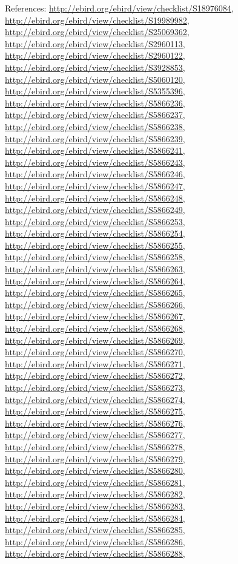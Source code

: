 \documentclass[9pt, article]{memoir}
\begin{document}
\begin{multicols}{2}
References: 
\url{http://ebird.org/ebird/view/checklist/S18976084}, 
\url{http://ebird.org/ebird/view/checklist/S19989982}, 
\url{http://ebird.org/ebird/view/checklist/S25069362}, 
\url{http://ebird.org/ebird/view/checklist/S2960113}, 
\url{http://ebird.org/ebird/view/checklist/S2960122}, 
\url{http://ebird.org/ebird/view/checklist/S3928853}, 
\url{http://ebird.org/ebird/view/checklist/S5060120}, 
\url{http://ebird.org/ebird/view/checklist/S5355396}, 
\url{http://ebird.org/ebird/view/checklist/S5866236}, 
\url{http://ebird.org/ebird/view/checklist/S5866237}, 
\url{http://ebird.org/ebird/view/checklist/S5866238}, 
\url{http://ebird.org/ebird/view/checklist/S5866239}, 
\url{http://ebird.org/ebird/view/checklist/S5866241}, 
\url{http://ebird.org/ebird/view/checklist/S5866243}, 
\url{http://ebird.org/ebird/view/checklist/S5866246}, 
\url{http://ebird.org/ebird/view/checklist/S5866247}, 
\url{http://ebird.org/ebird/view/checklist/S5866248}, 
\url{http://ebird.org/ebird/view/checklist/S5866249}, 
\url{http://ebird.org/ebird/view/checklist/S5866253}, 
\url{http://ebird.org/ebird/view/checklist/S5866254}, 
\url{http://ebird.org/ebird/view/checklist/S5866255}, 
\url{http://ebird.org/ebird/view/checklist/S5866258}, 
\url{http://ebird.org/ebird/view/checklist/S5866263}, 
\url{http://ebird.org/ebird/view/checklist/S5866264}, 
\url{http://ebird.org/ebird/view/checklist/S5866265}, 
\url{http://ebird.org/ebird/view/checklist/S5866266}, 
\url{http://ebird.org/ebird/view/checklist/S5866267}, 
\url{http://ebird.org/ebird/view/checklist/S5866268}, 
\url{http://ebird.org/ebird/view/checklist/S5866269}, 
\url{http://ebird.org/ebird/view/checklist/S5866270}, 
\url{http://ebird.org/ebird/view/checklist/S5866271}, 
\url{http://ebird.org/ebird/view/checklist/S5866272}, 
\url{http://ebird.org/ebird/view/checklist/S5866273}, 
\url{http://ebird.org/ebird/view/checklist/S5866274}, 
\url{http://ebird.org/ebird/view/checklist/S5866275}, 
\url{http://ebird.org/ebird/view/checklist/S5866276}, 
\url{http://ebird.org/ebird/view/checklist/S5866277}, 
\url{http://ebird.org/ebird/view/checklist/S5866278}, 
\url{http://ebird.org/ebird/view/checklist/S5866279}, 
\url{http://ebird.org/ebird/view/checklist/S5866280}, 
\url{http://ebird.org/ebird/view/checklist/S5866281}, 
\url{http://ebird.org/ebird/view/checklist/S5866282}, 
\url{http://ebird.org/ebird/view/checklist/S5866283}, 
\url{http://ebird.org/ebird/view/checklist/S5866284}, 
\url{http://ebird.org/ebird/view/checklist/S5866285}, 
\url{http://ebird.org/ebird/view/checklist/S5866286}, 
\url{http://ebird.org/ebird/view/checklist/S5866288}, 

\end{multicols}
\end{document}
